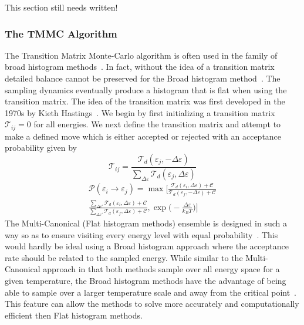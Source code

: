 \documentclass[letterpaper,twocolumn,amsmath,amssymb,pre,aps,10pt]{revtex4-1}
\begin{document}
This section still needs written!

\subsubsection{The TMMC Algorithm}

The Transition Matrix Monte-Carlo algorithm is often used in the family 
of broad histogram methods~\cite{swendsen1999transition}.  In fact, 
without the idea of a transition matrix detailed balance cannot be 
preserved for the Broad histogram method~\cite{wang1999broad}.  The 
sampling dynamics eventually produce a histogram that is flat when 
using the transition matrix.  The idea of the transition matrix was 
first developed in the 1970s by Kieth 
Hastings~\cite{hastings1970monte}.  We begin by first initializing a 
transition matrix $\mathcal{T}_{ij}=0$ for all energies.  We next 
define the transition matrix and attempt to make a defined move which 
is either accepted or rejected with an acceptance probability given by 
\begin{equation} \mathcal{T}_{ij} = 
\frac{\mathcal{T}_{d}(\varepsilon_j,-\Delta{\varepsilon})} 
{\sum\limits_{\Delta{\varepsilon}}\mathcal{T}_{d} 
(\varepsilon_j,\Delta{\varepsilon})} \end{equation} \begin{equation} 
\begin{split} \mathcal{P}(\varepsilon_i \rightarrow \varepsilon_j) = 
\max\bigg[\frac{\mathcal{T}_{d}(\varepsilon_i,\Delta{\varepsilon}) 
+\mathcal{C}}{\mathcal{T}_{d}(\varepsilon_f,-\Delta{\varepsilon}) 
+\mathcal{C}}\\\frac{\sum\limits_{\Delta{\varepsilon'}}\mathcal{T}_{d} 
(\varepsilon_i,\Delta{\varepsilon})+\mathcal{C}} 
{\sum\limits_{\Delta{\varepsilon'}}\mathcal{T}_{d}(\varepsilon_f, 
\Delta{\varepsilon})+\mathcal{C}},\exp{\bigg(-\frac{\Delta{\varepsilon}} 
{k_{B}T}\bigg)}\bigg] \end{split} \end{equation} The Multi-Canonical 
(Flat histogram methods) ensemble is designed in such a way so as to 
ensure visiting every energy level with equal 
probability~\cite{swendsen1999transition}.  This would hardly be ideal 
using a Broad histogram approach where the acceptance rate should be 
related to the sampled energy.  While similar to the Multi-Canonical 
approach in that both methods sample over all energy space for a given 
temperature, the Broad histogram methods have the advantage of being 
able to sample over a larger temperature scale and away from the 
critical point~\cite{Broadhistogram,BroadHistogram2}.  This feature can 
allow the methods to solve more accurately and computationally 
efficient then Flat histogram methods.
\end{document}
